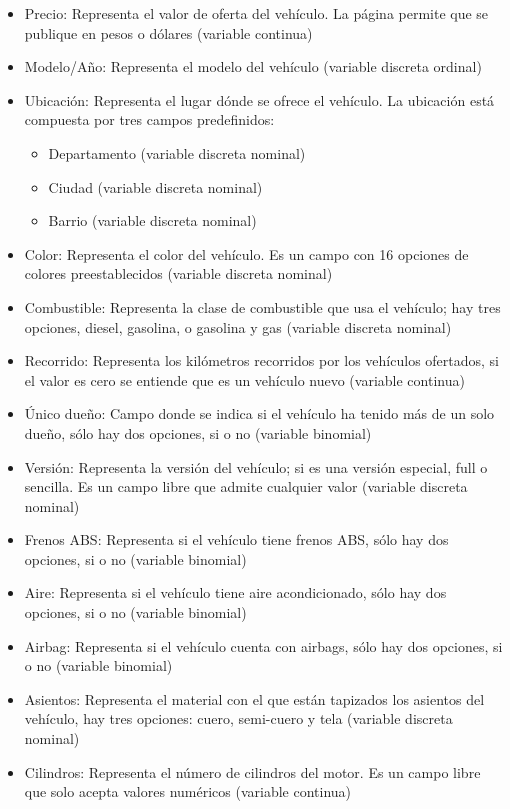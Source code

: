 \documentclass[a4paper]{article}
\begin{document}
\begin{itemize}
\item Precio: Representa el valor de oferta del vehículo. La página permite que se publique en pesos o dólares (variable continua)
\item Modelo/Año: Representa el modelo del vehículo (variable discreta ordinal)
\item Ubicación: Representa el lugar dónde se ofrece el vehículo. La ubicación está compuesta por tres campos predefinidos:
\begin{itemize}
\item Departamento (variable discreta nominal)
\item Ciudad (variable discreta nominal)
\item Barrio (variable discreta nominal)
\end{itemize}
\item Color: Representa el color del vehículo. Es un campo con 16 opciones de colores preestablecidos (variable discreta nominal)
\item Combustible: Representa la clase de combustible que usa el vehículo; hay tres opciones, diesel, gasolina, o gasolina y gas (variable discreta nominal)
\item Recorrido: Representa los kilómetros recorridos por los vehículos ofertados, si el valor es cero se entiende que es un vehículo nuevo (variable continua)
\item Único dueño: Campo donde se indica si el vehículo ha tenido más de un solo dueño, sólo hay dos opciones, si o no (variable binomial)
\item Versión: Representa la versión del vehículo; si es una versión especial, full o sencilla. Es un campo libre que admite cualquier valor (variable discreta nominal)
\item Frenos ABS: Representa si el vehículo tiene frenos ABS, sólo hay dos opciones, si o no (variable binomial)
\item Aire: Representa si el vehículo tiene aire acondicionado, sólo hay dos opciones, si o no (variable binomial)
\item Airbag: Representa si el vehículo cuenta con airbags, sólo hay dos opciones, si o no (variable binomial)
\item Asientos: Representa el material con el que están tapizados los asientos del vehículo, hay tres opciones: cuero, semi-cuero y tela (variable discreta nominal)
\item Cilindros: Representa el número de cilindros del motor. Es un campo libre que solo acepta valores numéricos (variable continua)

\end{itemize}
\end{document}
